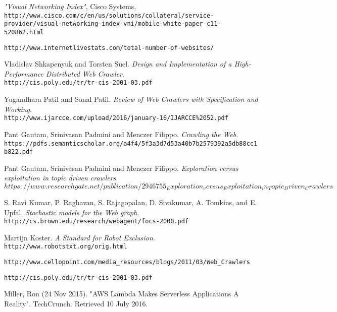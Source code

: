 \begin{thebibliography}{99}

\textit{"Visual Networking Index"}, Cisco Systems, \texttt{http://www.cisco.com/c/en/us/solutions/collateral/service-provider/visual-networking-index-vni/mobile-white-paper-c11-520862.html}
  
\texttt{http://www.internetlivestats.com/total-number-of-websites/}

Vladislav Shkapenyuk and Torsten Suel.
\textit{Design and Implementation of a High-Performance Distributed Web Crawler}.\\
\texttt{http://cis.poly.edu/tr/tr-cis-2001-03.pdf}

Yugandhara Patil and Sonal Patil.
\textit{Review of Web Crawlers with Specification and Working}.\\
\texttt{http://www.ijarcce.com/upload/2016/january-16/IJARCCE\%2052.pdf}

Pant Gautam, Srinivasan Padmini and Menczer Filippo.
\textit{Crawling the Web}.\\
\texttt{https://pdfs.semanticscholar.org/a4f4/5f3a3d7d53a40b7b2579392a5db88cc1b822.pdf}

Pant Gautam, Srinivasan Padmini and Menczer Filippo.
\textit{Exploration versus exploitation in topic driven crawlers}.\\
\texttt{$https://www.researchgate.net/publication/2946755_Exploration_versus_Exploitation_in_Topic_Driven_Crawlers$}

S. Ravi Kumar, P. Raghavan, S. Rajagopalan, D. Sivakumar, A. Tomkins, and E. Upfal.
\textit{Stochastic models for the Web graph}.\\
\texttt{http://cs.brown.edu/research/webagent/focs-2000.pdf}

Martijn Koster.
\textit{A Standard for Robot Exclusion}.\\
\texttt{http://www.robotstxt.org/orig.html}
  
\texttt{http://www.cellopoint.com/media\_resources/blogs/2011/03/Web\_Crawlers}

\texttt{http://cis.poly.edu/tr/tr-cis-2001-03.pdf}

Miller, Ron (24 Nov 2015). "AWS Lambda Makes Serverless Applications A Reality". TechCrunch. Retrieved 10 July 2016.


\end{thebibliography}
